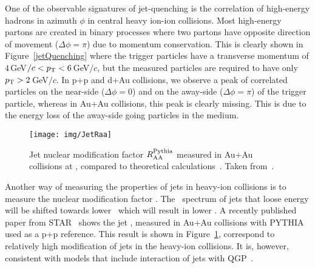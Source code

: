 One of the observable signatures of jet-quenching is the correlation of high-energy hadrons in azimuth $\phi$ in central heavy ion-ion collisions. Most high-energy partons are created in binary processes where two partons have opposite direction of movement ($\Delta\phi = \pi$) due to momentum conservation. This is clearly shown in Figure~\ref{jetQuenching} where the trigger particles have a transverse momentum of $4\,$GeV$/c < {p_{\mathrm{T}}} < 6\,$GeV$/c$, but the measured particles are required to have only ${p_{\mathrm{T}}} > 2\,$GeV$/c$\@. In p+p and d+Au collisions, we observe a peak of correlated particles on the near-side ($\Delta \phi = 0$) and on the away-side ($\Delta \phi = \pi$) of the trigger particle, whereas in Au+Au collisions, this peak is clearly missing. This is due to the energy loss of the away-side going particles in the medium.


\begin{figure}[!htb]
\centering
\texttt{[image: img/JetRaa]}
\caption[Jet nuclear modification factor $\Raa^\mathrm{Pythia}$ measured in Au+Au collisions at \snnFull.]{\label{jetRaa}Jet nuclear modification factor $\Raa^\mathrm{Pythia}$ measured in Au+Au collisions at \snnFull, compared to theoretical calculations~\cite{JetRaaNLOinitialState, JetRaaSCET1,JetRaaSCET2, JetRaaHybrid,JetRaaLBT1, JetRaaLBT2}. Taken from~\cite{RusyPaper}\@.}

\end{figure}

Another way of measuring the properties of jets in heavy-ion collisions is to measure the nuclear modification factor \Raa\@. The \pt\ spectrum of jets that loose energy will be shifted towards lower \pt\ which will result in lower \Raa\@. A recently published paper from STAR~\cite{RusyPaper} shows the jet \Raa, measured in Au+Au collisions with PYTHIA~\cite{PYTHIA} used as a p+p reference. This result is shown in Figure~\ref{jetRaa}, correspond to relatively high modification of jets in the heavy-ion collisions. It is, however, consistent with models that include interaction of jets with QGP~\cite{JetRaaNLOinitialState, JetRaaSCET1,JetRaaSCET2, JetRaaHybrid,JetRaaLBT1, JetRaaLBT2}\@.
